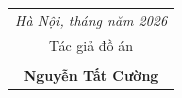 \vspace{2cm}

\begin{flushright}
    \begin{tabular}{c}
        \textit{Hà Nội, tháng \quad năm 2026} \\
        Tác giả đồ án \\
        \vspace{2.5cm} \\
        \textbf{Nguyễn Tất Cường}
    \end{tabular} \hspace{1cm}
\end{flushright}


\newpage








